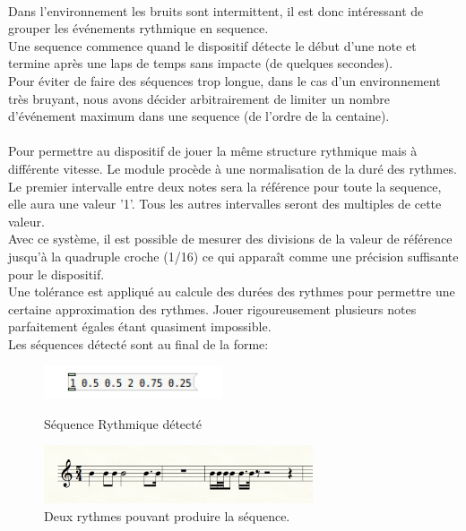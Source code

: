 \documentclass[a4paper, titlepage, oneside, 12pt]{article}%
\begin{document}
\paragraph{}
Dans l’environnement les bruits sont intermittent, il est donc intéressant de grouper les événements rythmique en sequence. \\
Une sequence commence quand le dispositif détecte le début d'une note et termine après une laps de temps sans impacte (de quelques secondes).\\
Pour éviter de faire des séquences trop longue, dans le cas d'un environnement très bruyant, nous avons décider arbitrairement de limiter un nombre d’événement maximum dans une sequence (de l'ordre de la centaine).

\paragraph{}
Pour permettre au dispositif de jouer la même structure rythmique mais à différente vitesse. Le module procède à une normalisation de la duré des rythmes.\\
Le premier intervalle entre deux notes sera la référence pour toute la sequence, elle aura une valeur '1'. Tous les autres intervalles seront des multiples de cette valeur.\\
Avec ce système, il est possible de mesurer des divisions de la valeur de référence jusqu'à la quadruple croche (1/16) ce qui apparaît comme une  précision suffisante pour le dispositif.\\
Une tolérance est appliqué au calcule des durées des rythmes pour permettre une certaine approximation des rythmes. Jouer rigoureusement plusieurs notes parfaitement égales étant quasiment impossible.\\
Les séquences détecté sont au final de la forme:\\
\begin{figure}[H]
	\centering
	\includegraphics[width=200px] {rythme.jpg}
	\caption{ Séquence Rythmique détecté}
	\includegraphics[width=300px]{structurerythme.jpg}
	\caption{Deux rythmes pouvant produire la séquence.}
\end{figure}
\end{document}
